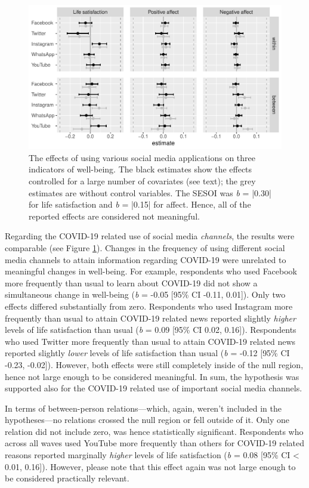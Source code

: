 \documentclass[
  english,
  man,mask,floatsintext]{apa6}
\begin{document}
\begin{figure}
\includegraphics[width=\textwidth]{figures/fig_results_channel} \caption{The effects of using various social media applications on three indicators of well-being. The black estimates show the effects controlled for a large number of covariates (see text); the grey estimates are without control variables. The SESOI was \textit{b} = |0.30| for life satisfaction and \textit{b} = |0.15| for affect. Hence, all of the reported effects are considered not meaningful.}\label{fig:res-channels}
\end{figure}

Regarding the COVID-19 related use of social media \emph{channels}, the results were comparable (see Figure \ref{fig:res-channels}).
Changes in the frequency of using different social media channels to attain information regarding COVID-19 were unrelated to meaningful changes in well-being.
For example, respondents who used Facebook more frequently than usual to learn about COVID-19 did not show a simultaneous change in well-being (\emph{b} = -0.05 {[}95\% CI -0.11, 0.01{]}).
Only two effects differed substantially from zero.
Respondents who used Instagram more frequently than usual to attain COVID-19 related news reported slightly \emph{higher} levels of life satisfaction than usual (\emph{b} = 0.09 {[}95\% CI 0.02, 0.16{]}).
Respondents who used Twitter more frequently than usual to attain COVID-19 related news reported slightly \emph{lower} levels of life satisfaction than usual (\emph{b} = -0.12 {[}95\% CI -0.23, -0.02{]}).
However, both effects were still completely inside of the null region, hence not large enough to be considered meaningful.
In sum, the hypothesis was supported also for the COVID-19 related use of important social media channels.

In terms of between-person relations---which, again, weren't included in the hypotheses---no relations crossed the null region or fell outside of it.
Only one relation did not include zero, was hence statistically significant.
Respondents who across all waves used YouTube more frequently than others for COVID-19 related reasons reported marginally \emph{higher} levels of life satisfaction (\emph{b} = 0.08 {[}95\% CI \textless{} 0.01, 0.16{]}).
However, please note that this effect again was not large enough to be considered practically relevant.
\end{document}
